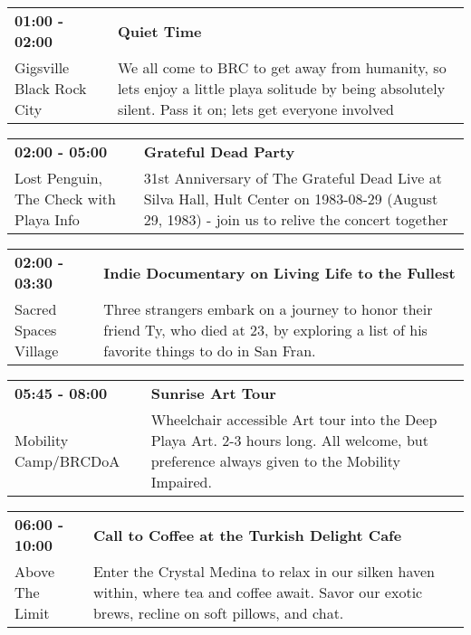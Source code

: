 \begin{tabular}{ p{1in} p{2.2in} }
    \textbf{01:00 - 02:00} & \textbf{Quiet Time} \\
    Gigsville \newline Black Rock City & We all come to BRC to get away from humanity, so lets enjoy a little playa solitude by being absolutely silent. Pass it on; lets get everyone involved \\
    \hline 
\end{tabular}
    
\begin{tabular}{ p{1in} p{2.2in} }
    \textbf{02:00 - 05:00} & \textbf{Grateful Dead Party} \\
    Lost Penguin, The \newline Check with Playa Info & 31st Anniversary of The Grateful Dead Live at Silva Hall, Hult Center on 1983-08-29 (August 29, 1983) - join us to relive the concert together \\
    \hline 
\end{tabular}
    
\begin{tabular}{ p{1in} p{2.2in} }
    \textbf{02:00 - 03:30} & \textbf{Indie Documentary on Living Life to the Fullest} \\
    Sacred Spaces Village \newline  & Three strangers embark on a journey to honor their friend Ty, who died at 23, by exploring a list of his favorite things to do in San Fran. \\
    \hline 
\end{tabular}
    
\begin{tabular}{ p{1in} p{2.2in} }
    \textbf{05:45 - 08:00} & \textbf{Sunrise Art Tour} \\
    Mobility Camp/BRCDoA \newline  & Wheelchair accessible Art tour into the Deep Playa Art.
2-3 hours long. All welcome, but preference always given to the Mobility Impaired. \\
    \hline 
\end{tabular}
    
\begin{tabular}{ p{1in} p{2.2in} }
    \textbf{06:00 - 10:00} & \textbf{Call to Coffee at the Turkish Delight Cafe} \\
    Above The Limit \newline  & Enter the Crystal Medina to relax in our silken haven within, where tea and coffee await. Savor our exotic brews, recline on soft pillows, and chat. \\
    \hline 
\end{tabular}
    
